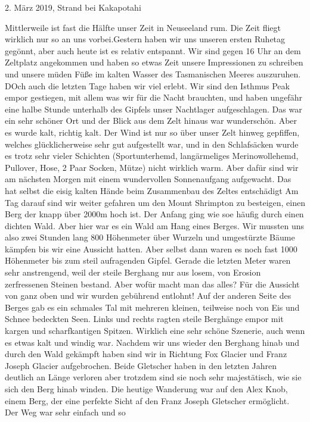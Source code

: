 \documentclass[11pt]{book}
\begin{document}
2. März 2019, Strand bei Kakapotahi

Mittlerweile ist fast die Hälfte unser Zeit in Neuseeland rum. Die Zeit fliegt wirklich nur so an uns vorbei.Gestern haben wir uns 
unseren ersten Ruhetag gegönnt, aber auch heute ist es relativ entspannt. Wir sind gegen 16 Uhr an dem Zeltplatz angekommen und 
haben so etwas Zeit unsere Impressionen zu schreiben und unsere müden Füße im kalten Wasser des Tasmanischen Meeres auszuruhen. 
DOch auch die letzten Tage haben wir viel erlebt. Wir sind den Isthmus Peak empor gestiegen, mit allem was wir für die Nacht brauchten, 
und haben ungefähr eine halbe Stunde unterhalb des Gipfels unser Nachtlager aufgeschlagen. Das war ein sehr schöner Ort und 
der Blick aus dem Zelt hinaus war wunderschön. Aber es wurde kalt, richtig kalt. Der Wind ist nur so über unser Zelt hinweg 
gepfiffen, welches glücklicherweise sehr gut aufgestellt war, und in den Schlafsäcken wurde es trotz sehr vieler Schichten 
(Sportunterhemd, langärmeliges Merinowollehemd, Pullover, Hose, 2 Paar Socken, Mütze) nicht wirklich warm. Aber dafür sind wir am nächsten 
Morgen mit einem wundervollen Sonnenaufgang aufgewacht. Das hat selbst die eisig kalten Hände beim Zusammenbau des Zeltes entschädigt 
Am Tag darauf sind wir weiter gefahren um den Mount Shrimpton zu besteigen, einen Berg der knapp über 2000m hoch ist. Der Anfang 
ging wie soe häufig durch einen dichten Wald. Aber hier war es ein Wald am Hang eines Berges. Wir mussten uns also zwei Stunden 
lang 800 Höhenmeter über Wurzeln und umgestürzte Bäume kämpfen bis wir eine Aussicht hatten. Aber selbst dann waren es noch fast 
1000 Höhenmeter bis zum steil aufragenden Gipfel. Gerade die letzten Meter waren sehr anstrengend, weil der steile Berghang nur aus 
losem, von Erosion zerfressenen Steinen bestand. Aber wofür macht man das alles? Für die Aussicht von ganz oben und wir wurden 
gebührend entlohnt! Auf der anderen Seite des Berges gab es ein schmales Tal mit mehreren kleinen, teilweise noch von Eis und 
Schnee bedeckten Seen. Links und rechts ragten steile Berghänge empor mit kargen und scharfkantigen Spitzen. Wirklich eine 
sehr schöne Szenerie, auch wenn es etwas kalt und windig war. Nachdem wir uns wieder den Berghang hinab und durch den Wald gekämpft haben 
sind wir in Richtung Fox Glacier und Franz Joseph Glacier aufgebrochen. Beide Gletscher haben in den letzten Jahren deutlich 
an Länge verloren aber trotzdem sind sie noch sehr majestätisch, wie sie sich den Berg hinab winden. Die heutige Wanderung war auf 
den Alex Knob, einem Berg, der eine perfekte Sicht af den Franz Joseph Gletscher ermöglicht. Der Weg war sehr einfach und so 
\end{document}

